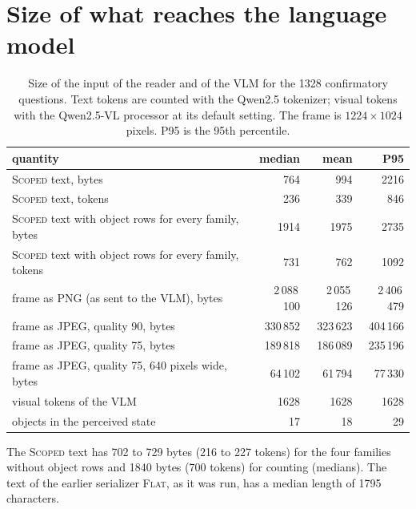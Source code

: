 \documentclass[10pt]{article}
\renewcommand{\thetable}{S\arabic{table}}
\newcommand{\settab}[1]{\setcounter{table}{#1}\addtocounter{table}{-1}\renewcommand{\thetable}{S\arabic{table}}}
\begin{document}
\section{Size of what reaches the language model}
\settab{7}\begin{table}[h]\centering\footnotesize
\caption{Size of the input of the reader and of the VLM for the 1328 confirmatory questions. Text tokens are counted with the Qwen2.5 tokenizer; visual tokens with the Qwen2.5-VL processor at its default setting. The frame is $1224{\times}1024$ pixels. P95 is the 95th percentile.}\label{tab:s7}
\begin{tabular}{@{}lrrr@{}}
\toprule quantity & median & mean & P95 \\ \midrule
\textsc{Scoped} text, bytes & 764 & 994 & 2216 \\
\textsc{Scoped} text, tokens & 236 & 339 & 846 \\
\textsc{Scoped} text with object rows for every family, bytes & 1914 & 1975 & 2735 \\
\textsc{Scoped} text with object rows for every family, tokens & 731 & 762 & 1092 \\ \midrule
frame as PNG (as sent to the VLM), bytes & 2\,088\,100 & 2\,055\,126 & 2\,406\,479 \\
frame as JPEG, quality 90, bytes & 330\,852 & 323\,623 & 404\,166 \\
frame as JPEG, quality 75, bytes & 189\,818 & 186\,089 & 235\,196 \\
frame as JPEG, quality 75, 640 pixels wide, bytes & 64\,102 & 61\,794 & 77\,330 \\
visual tokens of the VLM & 1628 & 1628 & 1628 \\ \midrule
objects in the perceived state & 17 & 18 & 29 \\
\bottomrule
\end{tabular}
\end{table}
The \textsc{Scoped} text has 702 to 729 bytes (216 to 227 tokens) for the four families without object rows and 1840 bytes (700 tokens) for counting (medians). The text of the earlier serializer \textsc{Flat}, as it was run, has a median length of 1795 characters.
\end{document}
